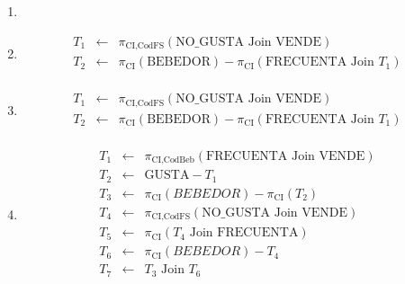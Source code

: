 \documentclass[12pt]{article}
\newcommand{\asig}{\ensuremath{\leftarrow}}
\begin{document}
\begin{enumerate}
 \item 

 \item 

\begin{eqnarray*}
 T_1 & \asig & \pi_{\text{CI,CodFS}}(\text{NO\_GUSTA} \text{ Join } \text{VENDE}) \\
 T_2 & \asig & \pi_{\text{CI}}(\text{BEBEDOR}) - \pi_{\text{CI}}(\text{FRECUENTA} \text{ Join } T_1) \\
\end{eqnarray*}

 \item 

\begin{eqnarray*}
 T_1 & \asig & \pi_{\text{CI,CodFS}}(\text{NO\_GUSTA} \text{ Join } \text{VENDE}) \\
 T_2 & \asig & \pi_{\text{CI}}(\text{BEBEDOR}) - \pi_{\text{CI}}(\text{FRECUENTA} \text{ Join } T_1) \\
\end{eqnarray*}

 \item 

\begin{eqnarray*}
 T_1 & \asig & \pi_{\text{CI,CodBeb}}(\text{FRECUENTA} \text{ Join } \text{VENDE}) \\
 T_2 & \asig & \text{GUSTA} -T_1 \\
 T_3 & \asig & \pi_{\text{CI}}(BEBEDOR) - \pi_{\text{CI}}(T_2) \\
 T_4 & \asig & \pi_{\text{CI,CodFS}}(\text{NO\_GUSTA} \text{ Join } \text{VENDE}) \\
 T_5 & \asig & \pi_{\text{CI}}(T_4 \text{ Join } \text{FRECUENTA}) \\
 T_6 & \asig & \pi_{\text{CI}}(BEBEDOR) - T_4 \\
 T_7 & \asig & T_3 \text { Join } T_6 \\
\end{eqnarray*}

\end{enumerate}
\end{document}
